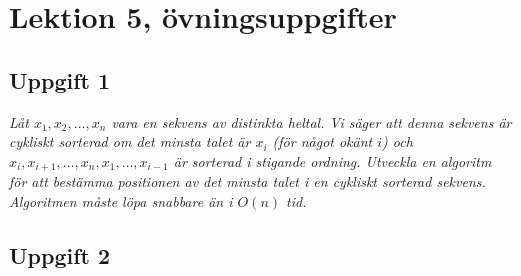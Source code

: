 \section{Lektion 5, övningsuppgifter}

\subsection{Uppgift 1}
\textit{Låt \(x_1,x_2,\ldots,x_n\) vara en sekvens av distinkta heltal. Vi säger
att denna sekvens är cykliskt sorterad om det minsta talet är $x_i$ (för något
okänt $i$) och \(x_i,x_{i+1},\ldots,x_n,x_1,\ldots,x_{i-1}\) är sorterad i
stigande ordning. Utveckla en algoritm för att bestämma positionen av det minsta
talet i en cykliskt sorterad sekvens. Algoritmen måste löpa snabbare än i
\(O(n)\) tid.}



\subsection{Uppgift 2}
\textit{}